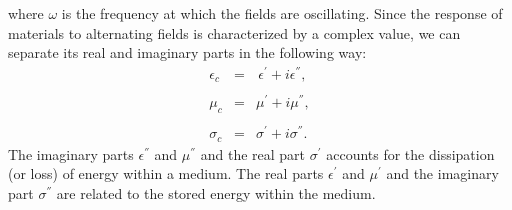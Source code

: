 where $\omega$ is the frequency at which the fields are oscillating. Since the response of materials to alternating fields is characterized by a complex value, we can separate its real and
imaginary parts in the following way:
\begin{eqnarray} 
    \epsilon_{c}\, &=&\, \epsilon^{'} + i \epsilon^{''},\label{complexPermittivity}
	\\\nonumber
	\\[-1em]
	\mu_{c} &=& \mu^{'} + i \mu^{''}, \label{ComplexPermeability}
	\\\nonumber
	\\[-1em]
	\sigma_{c} &=& \sigma^{'} + i \sigma^{''}.\label{ComplexConductivity}
\end{eqnarray}
The imaginary parts $\epsilon^{''}$ and $\mu^{''}$ and the real part $\sigma^{'}$ accounts for the dissipation (or loss) of energy within a medium. The real parts $\epsilon^{'}$ and $\mu^{'}$ and the imaginary part $\sigma^{''}$ are related to the stored energy within the medium.

